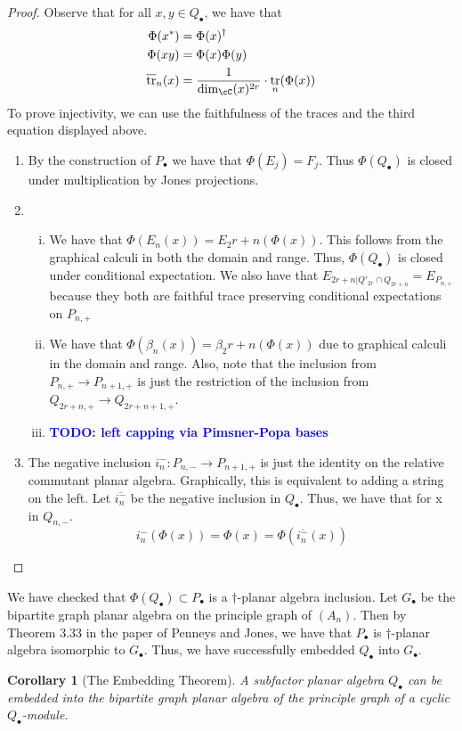 \documentclass[11pt]{article}
\theoremstyle{plain}
\newtheorem{cor}[thm]{Corollary}
\theoremstyle{definition}
\DeclareMathOperator{\tr}{tr}
\newcommand{\todo}[1]{\textcolor{blue}{\textbf{TODO: #1}}}
\begin{document}
\begin{proof}
Observe that for all $x,y \in Q_{\bullet}$, we have that 
\begin{align*}
	\Phi(x^{*}) &= \Phi(x)^{\dagger} \\
	\Phi(xy) &= \Phi(x)\Phi(y) \\
	\overline{\tr}_{n}(x) &= \frac{1}{\dim_\cC(x)^{2r}}\cdot\tr_{n}(\Phi(x)) 
\end{align*}
To prove injectivity, we can use the faithfulness of the traces and the third equation displayed above.
\begin{enumerate}[(1)]
\item By the construction of $P_{\bullet}$ we have that $\Phi(E_j)=F_j$. Thus $\Phi(Q_{\bullet})$ is closed under multiplication by Jones projections. 
\item \begin{enumerate}[(i)]
\item We have that $\Phi(E_n(x)) = E_2r+n(\Phi(x))$. This follows from the graphical calculi in both the domain and range. Thus, $\Phi(Q_{\bullet})$ is closed under conditional expectation. We also have that $E_{2r+n | Q'_{2r}\cap Q_{2r+n}} = E_{P_{n,+}}$ because they both are faithful trace preserving conditional expectations on $P_{n,+}$
\item We have that $\Phi(\beta_n(x)) = \beta_2r+n(\Phi(x))$ due to graphical calculi in the domain and range. Also, note that the inclusion from $P_{n,+} \to P_{n+1,+}$ is just the restriction of the inclusion from $Q_{2r+n,+} \to Q_{2r+n+1,+}$.
\item \todo{left capping via Pimsner-Popa bases}
\end{enumerate}
\item The negative inclusion $i^{-}_{n} : P_{n,-} \to P_{n+1,+}$ is just the identity on the relative commutant planar algebra. Graphically, this is equivalent to adding a string on the left. Let $\overline{i^{-}_{n}}$ be the negative inclusion in $Q_{\bullet}$. Thus, we have that for x in $Q_{n,-}$.
\[ i^{-}_{n}(\Phi(x)) = \Phi(x) = \Phi(\overline{i^{-}_{n}}(x)) \]
\end{enumerate}
\end{proof}

We have checked that $\Phi(Q_{\bullet}) \subset P_{\bullet}$ is a $\dagger$-planar algebra inclusion. Let $G_\bullet$ be the bipartite graph planar algebra on the principle graph of $(A_n)$. Then by Theorem 3.33 in the paper of Penneys and Jones, %
we have that $P_\bullet$ is $\dagger$-planar algebra isomorphic to $G_\bullet$. Thus, we have successfully embedded $Q_\bullet$ into $G_\bullet$.

\begin{cor}[The Embedding Theorem]
	A subfactor planar algebra $Q_\bullet$ can be embedded into the bipartite graph planar algebra of the principle graph of a cyclic $Q_\bullet$-module.
\end{cor}
\end{document}
